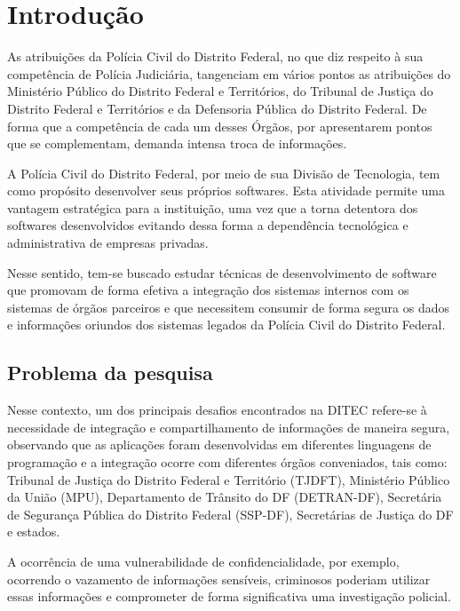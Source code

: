 \chapter{Introdução}\label{sec:introducao}
As atribuições da Polícia Civil do Distrito Federal, no que diz respeito à sua competência de Polícia Judiciária, tangenciam em vários pontos as atribuições do Ministério Público do Distrito Federal e Territórios, do Tribunal de Justiça do Distrito Federal e Territórios e da Defensoria Pública do Distrito Federal. De forma que a competência de cada um desses Órgãos, por apresentarem pontos que se complementam, demanda intensa troca de informações.

A Polícia Civil do Distrito Federal, por meio de sua Divisão de Tecnologia, tem como propósito desenvolver seus próprios softwares. Esta atividade permite uma vantagem estratégica para a instituição, uma vez que a torna detentora dos softwares desenvolvidos evitando dessa forma a dependência tecnológica e administrativa de empresas privadas.

Nesse sentido, tem-se buscado estudar técnicas de desenvolvimento de software que promovam de forma efetiva a integração dos sistemas internos com os sistemas de órgãos parceiros e que necessitem consumir de forma segura os dados e informações oriundos dos sistemas legados da Polícia Civil do Distrito Federal.

\section{Problema da pesquisa}

Nesse contexto, um dos principais desafios encontrados na DITEC refere-se à necessidade de integração e compartilhamento de informações de maneira segura, observando que as aplicações foram desenvolvidas em diferentes linguagens de programação e a integração ocorre com diferentes órgãos conveniados, tais como: Tribunal de Justiça do Distrito Federal e Território (TJDFT), Ministério Público da União (MPU), Departamento de Trânsito do DF (DETRAN-DF), Secretária de Segurança Pública do Distrito Federal (SSP-DF), Secretárias de Justiça do DF e estados.

A ocorrência de uma vulnerabilidade de confidencialidade, por exemplo, ocorrendo o vazamento de informações sensíveis, criminosos poderiam utilizar essas informações e comprometer de forma significativa uma investigação policial.

